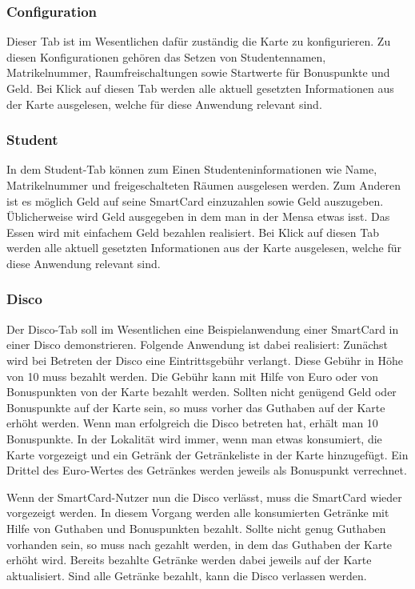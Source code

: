 \subsubsection{Configuration}
Dieser Tab ist im Wesentlichen dafür zuständig die Karte zu konfigurieren.
Zu diesen Konfigurationen gehören das Setzen von Studentennamen, Matrikelnummer, Raumfreischaltungen sowie Startwerte für Bonuspunkte und Geld.
Bei Klick auf diesen Tab werden alle aktuell gesetzten Informationen aus der Karte ausgelesen, welche für diese Anwendung relevant sind.

\subsubsection{Student}
In dem Student-Tab können zum Einen Studenteninformationen wie Name, Matrikelnummer und freigeschalteten Räumen ausgelesen werden.
Zum Anderen ist es möglich Geld auf seine SmartCard einzuzahlen sowie Geld auszugeben.
Üblicherweise wird Geld ausgegeben in dem man in der Mensa etwas isst.
Das Essen wird mit einfachem Geld bezahlen realisiert.
Bei Klick auf diesen Tab werden alle aktuell gesetzten Informationen aus der Karte ausgelesen, welche für diese Anwendung relevant sind.

\subsubsection{Disco}
Der Disco-Tab soll im Wesentlichen eine Beispielanwendung einer SmartCard in einer Disco demonstrieren.
Folgende Anwendung ist dabei realisiert:
Zunächst wird bei Betreten der Disco eine Eintrittsgebühr verlangt.
Diese Gebühr in Höhe von 10\texteuro{} muss bezahlt werden.
Die Gebühr kann mit Hilfe von Euro oder von Bonuspunkten von der Karte bezahlt werden.
Sollten nicht genügend Geld oder Bonuspunkte auf der Karte sein, so muss vorher das Guthaben auf der Karte erhöht werden.
Wenn man erfolgreich die Disco betreten hat, erhält man 10 Bonuspunkte.
In der Lokalität wird immer, wenn man etwas konsumiert, die Karte vorgezeigt und ein Getränk der Getränkeliste in der Karte hinzugefügt.
Ein Drittel des Euro-Wertes des Getränkes werden jeweils als Bonuspunkt verrechnet.

Wenn der SmartCard-Nutzer nun die Disco verlässt, muss die SmartCard wieder vorgezeigt werden.
In diesem Vorgang werden alle konsumierten Getränke mit Hilfe von Guthaben und Bonuspunkten bezahlt.
Sollte nicht genug Guthaben vorhanden sein, so muss nach gezahlt werden, in dem das Guthaben der Karte erhöht wird.
Bereits bezahlte Getränke werden dabei jeweils auf der Karte aktualisiert.
Sind alle Getränke bezahlt, kann die Disco verlassen werden.
 
